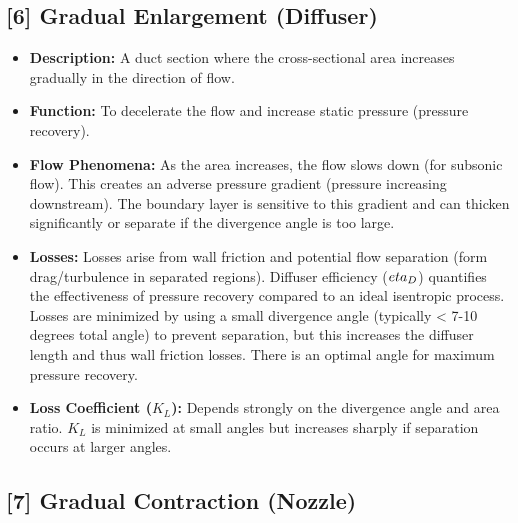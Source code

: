\hypertarget{gradual-enlargement-diffuser}{%
\subsection{{[}6{]} Gradual Enlargement
(Diffuser)}\label{gradual-enlargement-diffuser}}

\begin{itemize}
\tightlist
\item
  \textbf{Description:} A duct section where the cross-sectional area
  increases gradually in the direction of flow.
\item
  \textbf{Function:} To decelerate the flow and increase static pressure
  (pressure recovery).
\item
  \textbf{Flow Phenomena:} As the area increases, the flow slows down
  (for subsonic flow). This creates an adverse pressure gradient
  (pressure increasing downstream). The boundary layer is sensitive to
  this gradient and can thicken significantly or separate if the
  divergence angle is too large.
\item
  \textbf{Losses:} Losses arise from wall friction and potential flow
  separation (form drag/turbulence in separated regions). Diffuser
  efficiency (\(\\eta_D\)) quantifies the effectiveness of pressure
  recovery compared to an ideal isentropic process. Losses are minimized
  by using a small divergence angle (typically \textless{} 7-10 degrees
  total angle) to prevent separation, but this increases the diffuser
  length and thus wall friction losses. There is an optimal angle for
  maximum pressure recovery.
\item
  \textbf{Loss Coefficient (\(K_L\)):} Depends strongly on the
  divergence angle and area ratio. \(K_L\) is minimized at small angles
  but increases sharply if separation occurs at larger angles.
\end{itemize}

\hypertarget{gradual-contraction-nozzle}{%
\subsection{{[}7{]} Gradual Contraction
(Nozzle)}\label{gradual-contraction-nozzle}}

